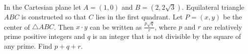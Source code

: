 In the Cartesian plane let $A = (1,0)$ and $B = \left( 2, 2\sqrt{3} \right)$.  Equilateral triangle $ABC$ is constructed so that $C$ lies in the first quadrant.  Let $P=(x,y)$ be the center of $\triangle ABC$.  Then $x \cdot y$ can be written as $\tfrac{p\sqrt{q}}{r}$, where $p$ and $r$ are relatively prime positive integers and $q$ is an integer that is not divisible by the square of any prime.  Find $p+q+r$.